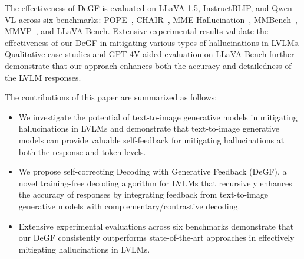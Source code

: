 

The effectiveness of DeGF is evaluated on LLaVA-1.5, InstructBLIP, and Qwen-VL across six benchmarks: POPE~\citep{li2023evaluating}, CHAIR~\citep{rohrbach2018object}, MME-Hallucination~\citep{fu2023mme}, MMBench~\citep{liu2025mmbench}, MMVP~\citep{tong2024eyes}, and LLaVA-Bench. Extensive experimental results validate the effectiveness of our DeGF in mitigating various types of hallucinations in LVLMs. Qualitative case studies and GPT-4V-aided evaluation on LLaVA-Bench further demonstrate that our approach enhances both the accuracy and detailedness of the LVLM responses. 

The contributions of this paper are summarized as follows:
\begin{itemize}
    \item We investigate the potential of text-to-image generative models in mitigating hallucinations in LVLMs and demonstrate that text-to-image generative models can provide valuable self-feedback for mitigating hallucinations at both the response and token levels.
    \item We propose self-correcting Decoding with Generative Feedback (DeGF), a novel training-free decoding algorithm for LVLMs that recursively enhances the accuracy of responses by integrating feedback from text-to-image generative models with complementary/contrastive decoding.
    \item Extensive experimental evaluations across six benchmarks demonstrate that our DeGF consistently outperforms state-of-the-art approaches in effectively mitigating hallucinations in LVLMs.
\end{itemize}
